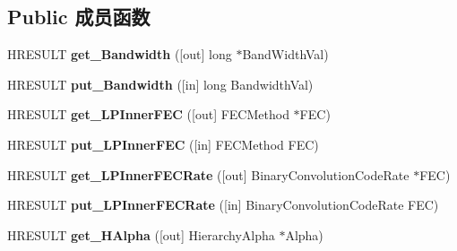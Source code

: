 \subsection*{Public 成员函数}
\begin{DoxyCompactItemize}
\item 
\mbox{\label{interface_i_d_v_b_t_locator_a38ca6d904478857cef36e4d0d5120b1b}} 
H\+R\+E\+S\+U\+LT {\bfseries get\+\_\+\+Bandwidth} (\mbox{[}out\mbox{]} long $\ast$Band\+Width\+Val)
\item 
\mbox{\label{interface_i_d_v_b_t_locator_a087e329cc59231efd7ee8152d9c7c60c}} 
H\+R\+E\+S\+U\+LT {\bfseries put\+\_\+\+Bandwidth} (\mbox{[}in\mbox{]} long Bandwidth\+Val)
\item 
\mbox{\label{interface_i_d_v_b_t_locator_a1c6f65fc32ad2b02d05ad6c3b25f3fa9}} 
H\+R\+E\+S\+U\+LT {\bfseries get\+\_\+\+L\+P\+Inner\+F\+EC} (\mbox{[}out\mbox{]} F\+E\+C\+Method $\ast$F\+EC)
\item 
\mbox{\label{interface_i_d_v_b_t_locator_ab3faa465b50161270ad5d5271c178d51}} 
H\+R\+E\+S\+U\+LT {\bfseries put\+\_\+\+L\+P\+Inner\+F\+EC} (\mbox{[}in\mbox{]} F\+E\+C\+Method F\+EC)
\item 
\mbox{\label{interface_i_d_v_b_t_locator_a6820c5f32e8ed3675d573a3b70968fb3}} 
H\+R\+E\+S\+U\+LT {\bfseries get\+\_\+\+L\+P\+Inner\+F\+E\+C\+Rate} (\mbox{[}out\mbox{]} Binary\+Convolution\+Code\+Rate $\ast$F\+EC)
\item 
\mbox{\label{interface_i_d_v_b_t_locator_a24dc4019989d6993c81019ded11b1fd2}} 
H\+R\+E\+S\+U\+LT {\bfseries put\+\_\+\+L\+P\+Inner\+F\+E\+C\+Rate} (\mbox{[}in\mbox{]} Binary\+Convolution\+Code\+Rate F\+EC)
\item 
\mbox{\label{interface_i_d_v_b_t_locator_af4ea7c87a453520e8506ac473df79840}} 
H\+R\+E\+S\+U\+LT {\bfseries get\+\_\+\+H\+Alpha} (\mbox{[}out\mbox{]} Hierarchy\+Alpha $\ast$Alpha)
\item 
\mbox{\label{interface_i_d_v_b_t_locator_a56b3130bfd734dc2477f95712b42f990}} 

\end{DoxyCompactItemize}
